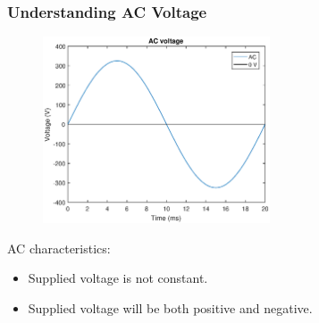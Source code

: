 \documentclass{beamer}
\begin{document}
	\begin{frame}\frametitle{Understanding AC Voltage}

		\begin{figure}
			\centering
			\includegraphics[width=0.6\textwidth]{ac-wave.eps}
		\end{figure}

		AC characteristics:

		\begin{itemize}

			\item Supplied voltage is not constant.

			\item Supplied voltage will be both positive and negative.

		\end{itemize}
		
	\end{frame}
\end{document}
